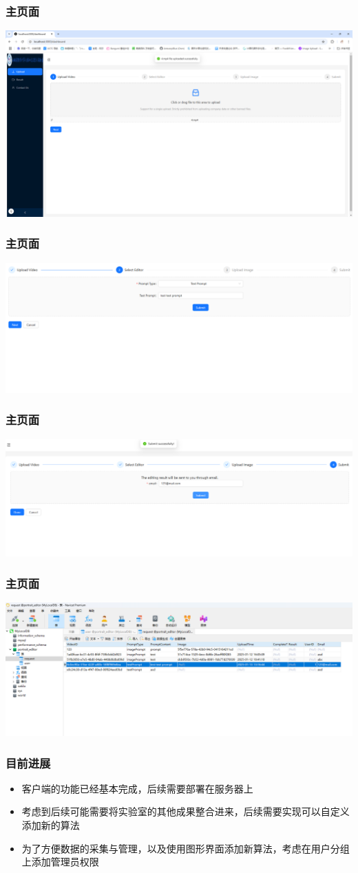 \documentclass{beamer}
\begin{document}
\begin{frame}
    \frametitle{主页面}
    \includegraphics[width=\textwidth]{pic4.png}
\end{frame}

\begin{frame}
    \frametitle{主页面}
    \includegraphics[width=\textwidth]{pic5.png}
\end{frame}
\begin{frame}
    \frametitle{主页面}
    \includegraphics[width=\textwidth]{pic6.png}
\end{frame}
\begin{frame}
    \frametitle{主页面}
    \includegraphics[width=\textwidth]{pic7.png}
\end{frame}

\begin{frame}
    \frametitle{目前进展}
    \begin{itemize}
        \item 客户端的功能已经基本完成，后续需要部署在服务器上
        \item 考虑到后续可能需要将实验室的其他成果整合进来，后续需要实现可以自定义添加新的算法
        \item 为了方便数据的采集与管理，以及使用图形界面添加新算法，考虑在用户分组上添加管理员权限
    \end{itemize}
\end{frame}
\end{document}
